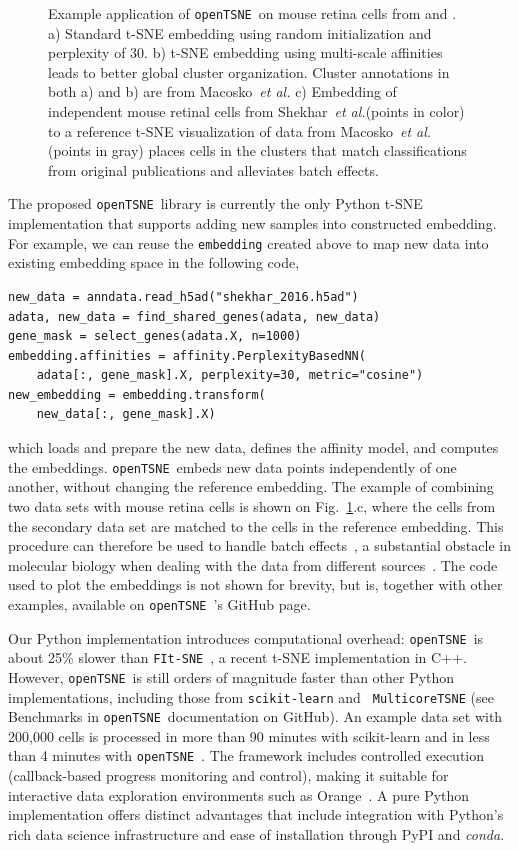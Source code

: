 \documentclass{bioinfo}
\def\etal{{\em et al.}\xspace}
\newcommand{\opentsne}[0]{{\tt openTSNE}\ }
\begin{document}
\begin{figure}[htbp]
\caption{Example application of \opentsne on mouse retina cells from
\citet{Macosko2015} and \citet{Shekhar2016}. a) Standard t-SNE embedding using
random initialization and perplexity of 30. b) t-SNE embedding using
multi-scale affinities leads to better global cluster organization. Cluster
annotations in both a) and b) are from Macosko~\etal c) Embedding of independent mouse retinal cells from
Shekhar~\etal (points in color) to a reference t-SNE visualization of data from
Macosko~\etal (points in gray) places cells in the clusters that match
classifications from original publications and alleviates batch effects.}
\label{fig:tsne}
\end{figure}

The proposed \opentsne library is currently the only Python t\nobreakdash -SNE
implementation that supports adding new samples into constructed embedding. For
example, we can reuse the {\tt embedding} created above to map new data into
existing embedding space in the following code,

\begin{lstlisting}
new_data = anndata.read_h5ad("shekhar_2016.h5ad")
adata, new_data = find_shared_genes(adata, new_data)
gene_mask = select_genes(adata.X, n=1000)
embedding.affinities = affinity.PerplexityBasedNN(
	adata[:, gene_mask].X, perplexity=30, metric="cosine")
new_embedding = embedding.transform(
	new_data[:, gene_mask].X)
\end{lstlisting}

\noindent which loads and prepare the new data, defines the affinity model, and
computes the embeddings. \opentsne embeds new data points independently of one 
another, without changing the reference embedding. The example of combining two
data sets with mouse retina cells is shown on Fig.~\ref{fig:tsne}.c, where the
cells from the secondary data set are matched to the cells in the reference
embedding. This
procedure can therefore be used to handle batch effects~\citep{polivcar2019embedding}, a substantial
obstacle in molecular biology when dealing with the data from different
sources~\citep{batch_effect_causes}. The code used to plot the embeddings is not shown
for brevity, but is, together with other examples, available on {\opentsne}'s
GitHub page. 

Our Python implementation introduces computational overhead: \opentsne is about
25\% slower than {\tt FIt-SNE}~\citep{fi_tsne}, a recent t-SNE implementation
in C++. However, \opentsne is still orders of magnitude faster than other
Python implementations, including those from {\tt scikit-learn} and {\tt
MulticoreTSNE} (see Benchmarks in \opentsne documentation on GitHub). An example data set with 200,000 cells
is processed in more than 90 minutes with scikit-learn and in less than 4 minutes with \opentsne.
The framework includes controlled execution (callback-based progress monitoring and
control), making it suitable for interactive data exploration environments such
as Orange~\citep{scorange}. A pure Python implementation offers distinct
advantages that include integration with Python's rich data science
infrastructure and ease of installation through PyPI and {\em conda}.
\end{document}
